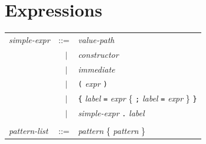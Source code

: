 \documentclass[11pt,titlepage,twoside]{report}
\newcommand{\alt}{\;|\;}
\newcommand{\Minusgreater}{\mbox{{\tt ->}}}
\newcommand{\Equalgreater}{\mbox{{\tt =>}}}
\newcommand{\term}[1]{{\tt #1}}
\newcommand{\nterm}[1]{{\em #1}}
\begin{document}
\section{Expressions}
\label{expressions}
\begin{center}
\begin{tabular}{lcl}
\nterm{simple-expr}
  & ::=        & \nterm{value-path} \\
  & $\;\;\alt$ & \nterm{constructor} \\
  & $\;\;\alt$ & \nterm{immediate} \\
  & $\;\;\alt$ & \term{(} \nterm{expr} \term{)} \\
  & $\;\;\alt$ & \term{\{} \nterm{label} \term{=} \nterm{expr}
                 \{ \term{;} \nterm{label} \term{=} \nterm{expr} \} 
                 \term{\}} \\
  & $\;\;\alt$ & \nterm{simple-expr} \term{.} \nterm{label}
\\ \\
\nterm{pattern-list}           
   & ::=        & \nterm{pattern} \{ \nterm{pattern} \}
\end{tabular}
\end{center}
\end{document}
